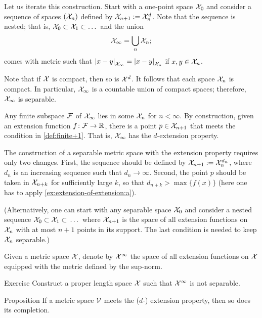 Let us iterate this construction.
Start with a one-point space $\mathcal{X}_0$ and consider a sequence of spaces $(\mathcal{X}_n)$ defined by $\spc{X}_{n+1}\z\df\spc{X}_n^d$.
Note that the sequence is nested;
that is, $\mathcal{X}_0\subset \mathcal{X}_1\subset\dots$
and the union
\[\mathcal{X}_\infty=\bigcup_n\mathcal{X}_n;\]
comes with metric such that
$\dist{x}{y}{\spc{X}_\infty} = \dist{x}{y}{\spc{X}_n}$
if $x,y\in\mathcal{X}_n$.

Note that if $\mathcal{X}$ is compact, then so is $\mathcal{X}^d$.
It follows that each space $\mathcal{X}_n$ is compact.
In particular, $\mathcal{X}_\infty$ is a countable union of compact spaces;
therefore, $\mathcal{X}_\infty$ is separable.

Any finite subspace $\mathcal{F}$ of $\mathcal{X}_\infty$ lies in some $\mathcal{X}_n$ for $n<\infty$.
By construction, given an extension function $f\colon\mathcal{F}\to\mathbb{R}$,
there is a point $p\in \mathcal{X}_{n+1}$ that meets the condition in \ref{def:finite+1}.
That is, $\mathcal{X}_\infty$ has the $d$-extension property.

The construction of a separable metric space with the extension property requires only two changes.
First, the sequence should be defined by $\spc{X}_{n+1}\z\df\spc{X}_n^{d_n}$, where $d_n$ is an increasing sequence such that $d_n\to\infty$.
Second, the point $p$ should be taken in $\mathcal{X}_{n+k}$ for sufficiently large $k$, so that $d_{n+k}>\max\{f(x)\}$
(here one has to apply \ref{ex:extension-of-extension:a}).%

(Alternatively, one can start with any separable space $\mathcal{X}_0$ and consider a nested sequence $\mathcal{X}_0\subset \mathcal{X}_1\subset{}\dots$ where $\mathcal{X}_{n+1}$ is the space of all extension functions on $\mathcal{X}_{n}$ with at most $n+1$ points in its support.
The last condition is needed to keep $\mathcal{X}_{n}$ separable.)
\qeds

Given a metric space $\mathcal{X}$, denote by $\mathcal{X}^\infty$ the space of all extension functions on $\mathcal{X}$ equipped with the metric defined by the sup-norm.

\begin{thm}{Exercise}\label{ex:inf-extension}
Construct a proper length space $\mathcal{X}$ such that $\mathcal{X}^\infty$ is not separable.
\end{thm}


\begin{thm}{Proposition}\label{prop:completion-univeral}
If a metric space $\mathcal{V}$ meets the ($d$-) extension property, then so does its completion.
\end{thm}

